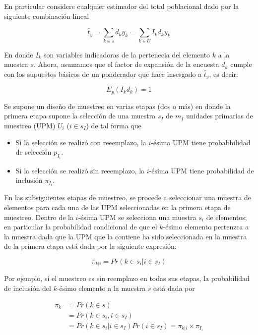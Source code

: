 \documentclass[
  10pt,
  spanish,
]{book}
\providecommand{\tightlist}{%
  \setlength{\itemsep}{0pt}\setlength{\parskip}{0pt}}
\begin{document}
En particular considere cualquier estimador del total poblacional dado por la siguiente combinación lineal

\begin{equation}
\label{est}
\hat{t}_{y}=\sum_{k\in s} d_k y_k = \sum_{k\in U} I_k d_k y_k 
\end{equation}

En donde \(I_k\) son variables indicadoras de la pertenecia del elemento \(k\) a la muestra \(s\). Ahora, asumamos que el factor de expansión de la encuesta \(d_k\) cumple con los supuestos básicos de un ponderador que hace insesgado a \(\hat{t}_{y}\), es decir:

\begin{equation*}
E_p(I_k d_k) = 1
\end{equation*}

Se supone un diseño de muestreo en varias etapas (dos o más) en donde la primera etapa supone la selección de una muestra \(s_I\) de \(m_I\) unidades primarias de muestreo (UPM) \(U_i\) (\(i\in s_I\)) de tal forma que

\begin{itemize}
\tightlist
\item
  Si la selección se realizó con reeemplazo, la \(i\)-ésima UPM tiene probabhilidad de selección \(p_{I_i}\).
\item
  Si la selección se realizó sin reeemplazo, la \(i\)-ésima UPM tiene probabilidad de inclusión \(\pi_{I_i}\).
\end{itemize}

En las subsiguientes etapas de muestreo, se procede a seleccionar una muestra de elementos para cada una de las UPM seleccionadas en la primera etapa de muestreo. Dentro de la \(i\)-ésima UPM se selecciona una muestra \(s_i\) de elementos; en particular la probabilidad condicional de que el \(k\)-ésimo elemento pertenzca a la muestra dada que la UPM que la contiene ha sido seleccionada en la muestra de la primera etapa está dada por la siguiente expresión:

\begin{equation*}
\pi_{k|i} = Pr(k \in s_i | i \in s_I)
\end{equation*}

Por ejemplo, si el muestreo es sin reemplazo en todas sus etapas, la probabilidad de inclusión del \(k\)-ésimo elemento a la muestra \(s\) está dada por

\begin{align*}
\label{piki}
\pi_k & = Pr(k \in s)\\ 
& = Pr(k \in s_i, i \in s_I) \\
& = Pr(k \in s_i | i \in s_I) Pr(i \in s_I) = \pi_{k|i} \times \pi_{I_i}
\end{align*}
\end{document}
